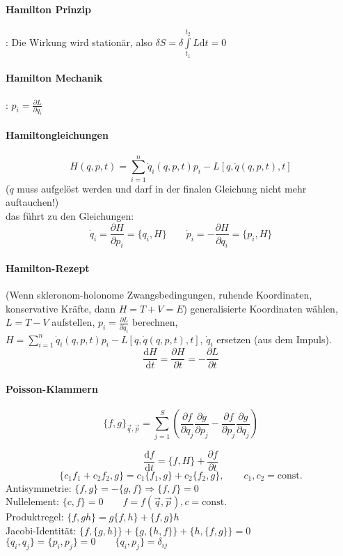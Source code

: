 \documentclass[a4paper, 11pt, fleqn]{article}
\renewcommand{\vec}{\overrightarrow}
\newcommand{\const}{\mathrm{const.}}
\newcommand{\md}{\mathrm{d}}
\newcommand{\pd}[2]{\frac{\partial #1}{\partial #2}}
\newcommand{\ad}[2]{\frac{\md #1}{\md #2}}
\begin{document}
\begin{multicols}{2}
\paragraph{Hamilton Prinzip}: Die Wirkung wird stationär, also $\delta S = \delta \int\limits_{t_1}^{t_2}L\md t = 0$

\paragraph{Hamilton Mechanik}: $p_i = \pd{L}{\dot q_i}$

\paragraph{Hamiltongleichungen}
\[H(q,p,t) = \sum\limits_{i=1}^n\dot q_i(q,p,t)p_i-L[q,\dot q(q,p,t),t]\]
($\dot q$ muss aufgelöst werden und darf in der finalen Gleichung nicht mehr auftauchen!)\\
das führt zu den Gleichungen:
\[\dot q_i = \pd{H}{p_i} = \{q_i, H\} \qquad \dot p_i = -\pd{H}{q_i} = \{p_i, H\}\]
\paragraph{Hamilton-Rezept}
(Wenn skleronom-holonome Zwangsbedingungen, ruhende Koordinaten, konservative Kräfte, dann $H=T+V=E$)
generalisierte Koordinaten wählen, $L = T - V$ aufstellen, $p_i = \pd{L}{\dot q_i}$ berechnen, $H=\sum\limits_{i=1}^n\dot q_i(q,p,t)p_i-L[q,\dot q(q,p,t),t]$, $\dot q_i$ ersetzen (aus dem Impuls).
\[\ad{H}{t}=\pd{H}{t} =-\pd{L}{t}\]

\paragraph{Poisson-Klammern}
\[\{f,g\}_{\vec q, \vec p} = \sum\limits_{j=1}^S \left(\frac{\partial f}{\partial q_j}\frac{\partial g}{\partial p_j} - \frac{\partial f}{\partial p_j}\frac{\partial g}{\partial q_j} \right)\]

\[\ad{f}{t} = \{f,H\} + \pd{f}{t}\]
\[\{c_1f_1+c_2f_2,g\} = c_1\{f_1,g\} + c_2\{f_2,g\}, \qquad c_1,c_2=\const\]
Antisymmetrie: $\{f,g\} = -\{g,f\} \Rightarrow \{f,f\}=0$\\
Nullelement: $\{c,f\} = 0 \qquad f=f(\vec q, \vec p), c=\const$\\
Produktregel: $\{f,gh\} = g\{f,h\} + \{f,g\}h$\\
Jacobi-Identität: $\{f,\{g,h\}\} + \{g,\{h,f\}\} + \{h,\{f,g\}\} = 0$\\
$\{q_i,q_j\} = \{p_i,p_j\} = 0 \qquad \{q_i,p_j\} = \delta_{ij}$

\end{multicols}
\end{document}
